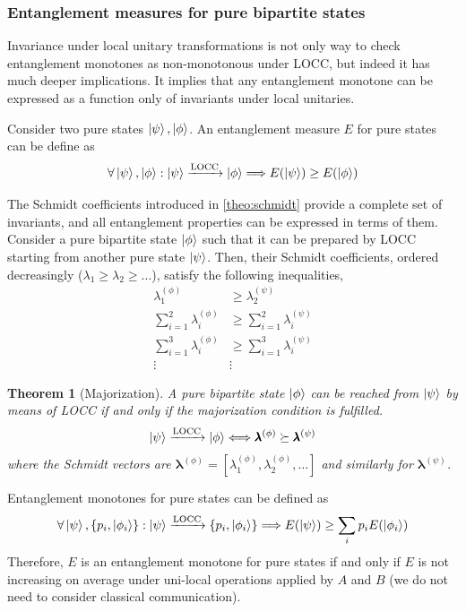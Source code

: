 \documentclass[10pt,a4paper]{book}
\numberwithin{equation}{chapter}
\numberwithin{figure}{chapter}
\numberwithin{table}{chapter}
\newtheorem{theorem}{Theorem}[section]
\begin{document}
\subsubsection{Entanglement measures for pure bipartite states}
Invariance under local unitary transformations is not only way to check entanglement monotones as non-monotonous under LOCC, but indeed it has much deeper implications. It implies that any entanglement monotone can be expressed as a function only of invariants under local unitaries.

Consider two pure states $\ket{\psi},\ket{\phi}$. An entanglement measure $E$ for pure states can be define as 
\begin{equation}
\forall \ket{\psi},\ket{\phi}: \ket{\psi} \xrightarrow{\text{LOCC}} \ket{\phi} \Longrightarrow E(\ket{\psi})\geq E(\ket{\phi})
\end{equation}

The Schmidt coefficients introduced in \autoref{theo:schmidt} provide a complete set of invariants, and all entanglement properties can be expressed in terms of them. Consider a pure bipartite state $\ket{\phi}$  such that it can be prepared by LOCC starting from another pure state $\ket{\psi}$. Then, their Schmidt coefficients, ordered decreasingly ($\lambda_1 \geq \lambda_2 \geq \ldots$), satisfy the following inequalities,
\begin{align*}
\lambda^{(\phi )}_1 &\geq \lambda^{(\psi )}_2 \\
\sum^{2}_{i=1}\lambda^{(\phi )}_i &\geq \sum^{2}_{i=1} \lambda^{(\psi )}_i \\
\sum^{3}_{i=1}\lambda^{(\phi )}_i &\geq \sum^{3}_{i=1} \lambda^{(\psi )}_i \\
\vdots & \vdots 
\end{align*}

\begin{theorem}[Majorization] A pure bipartite state $\ket{\phi}$ can be reached from $\ket{\psi}$ by means of LOCC if and only if the majorization condition is fulfilled.
\begin{equation}
\ket{\psi} \xrightarrow{\text{LOCC}} \ket{\phi} \Longleftrightarrow \pmb{\lambda}^{(\phi )} \succeq \pmb{\lambda}^{(\psi )}
\end{equation}
where the Schmidt vectors are $\pmb{\lambda}^{(\phi )}=[\lambda^{(\phi )}_1 , \lambda^{(\phi )}_2 , \ldots ]$ and similarly for $\pmb{\lambda}^{(\psi )}$.
\end{theorem}

Entanglement monotones for pure states can be defined as
\begin{equation}
\forall \ket{\psi},\lbrace p_i,\ket{\phi_i}\rbrace : \ket{\psi} \xrightarrow{\text{LOCC}} \lbrace p_i,\ket{\phi_i}\rbrace \Longrightarrow E(\ket{\psi})\geq \sum_i p_i E(\ket{\phi_i}) 
\end{equation}
Therefore, $E$ is an entanglement monotone for pure states if and only if $E$ is not increasing on average under uni-local operations applied by $A$ and $B$ (we do not need to consider classical communication).
\end{document}
